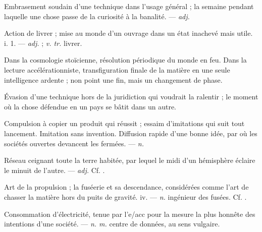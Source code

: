   Embrasement soudain d'une technique dans l'usage général ; la semaine pendant laquelle une chose passe de la curiosité à la banalité.  ---  \textit{adj.}

 Action de livrer ; mise au monde d'un ouvrage dans un état inachevé mais utile.   i. 1. ---  \textit{adj.} ;  \textit{v. tr.} livrer.

  Dans la cosmologie stoïcienne, résolution périodique du monde en feu.   Dans la lecture accélérationniste, transfiguration finale de la matière en une seule intelligence ardente ; non point une fin, mais un changement de phase.

 Évasion d'une technique hors de la juridiction qui voudrait la ralentir ; le moment où la chose défendue en un pays se bâtit dans un autre. 

 Compulsion à copier un produit qui réussit ; essaim d'imitations qui suit tout lancement.   Imitation sans invention.   Diffusion rapide d'une bonne idée, par où les sociétés ouvertes devancent les fermées. ---  \textit{n.}

 Réseau ceignant toute la terre habitée, par lequel le midi d'un hémisphère éclaire le minuit de l'autre. ---  \textit{adj.} Cf. .

 Art de la propulsion ; la fuséerie et sa descendance, considérées comme l'art de chasser la matière hors du puits de gravité.   iv. ---  \textit{n.} ingénieur des fusées. Cf. .

 Consommation d'électricité, tenue par l'e/acc pour la mesure la plus honnête des intentions d'une société. ---  \textit{n. m.} centre de données, au sens vulgaire.

